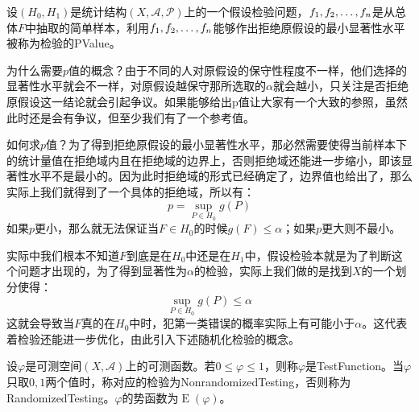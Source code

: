 \begin{definition}
	设$(H_0,H_1)$是统计结构$(X,\mathscr{A},\mathscr{P})$上的一个假设检验问题，$f_1, f_2, \dots, f_{n}$是从总体$F$中抽取的简单样本，利用$f_1, f_2, \dots, f_{n}$能够作出拒绝原假设的最小显著性水平被称为检验的\gls{PValue}。
\end{definition}
\begin{note}
	为什么需要$p$值的概念？由于不同的人对原假设的保守性程度不一样，他们选择的显著性水平就会不一样，对原假设越保守那所选取的$\alpha$就会越小，只关注是否拒绝原假设这一结论就会引起争议。如果能够给出p值让大家有一个大致的参照，虽然此时还是会有争议，但至少我们有了一个参考值。\par
	如何求$p$值？为了得到拒绝原假设的最小显著性水平，那必然需要使得当前样本下的统计量值在拒绝域内且在拒绝域的边界上，否则拒绝域还能进一步缩小，即该显著性水平不是最小的。因为此时拒绝域的形式已经确定了，边界值也给出了，那么实际上我们就得到了一个具体的拒绝域，所以有：
	\begin{equation*}
		p=\sup_{P\in H_0}g(P)
	\end{equation*}
	如果$p$更小，那么就无法保证当$F\in H_0$的时候$g(F)\leqslant\alpha$；如果$p$更大则不最小。
\end{note}
\begin{note}
	实际中我们根本不知道$F$到底是在$H_0$中还是在$H_1$中，假设检验本就是为了判断这个问题才出现的，为了得到显著性为$\alpha$的检验，实际上我们做的是找到$X$的一个划分使得：
	\begin{equation*}
		\sup_{P\in H_0}g(P)\leqslant\alpha
	\end{equation*}
	这就会导致当$F$真的在$H_0$中时，犯第一类错误的概率实际上有可能小于$\alpha$。这代表着检验还能进一步优化，由此引入下述随机化检验的概念。
\end{note}
\begin{definition}
	设$\varphi$是可测空间$(X,\mathscr{A})$上的可测函数。若$0\leqslant\varphi\leqslant1$，则称$\varphi$是\gls{TestFunction}。当$\varphi$只取$0,1$两个值时，称对应的检验为\gls{NonrandomizedTesting}，否则称为\gls{RandomizedTesting}。$\varphi$的势函数为$\operatorname{E}(\varphi)$。
\end{definition}


